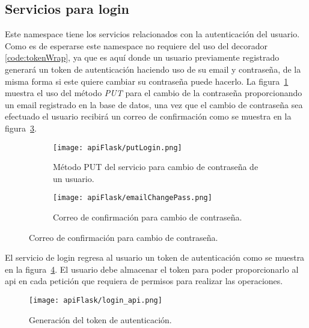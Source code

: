 \subsection{Servicios para login}

Este namespace tiene los servicios relacionados con la autenticación del usuario. Como es de esperarse este namespace no requiere del uso del decorador \ref{code:tokenWrap}, ya que es aquí donde un usuario previamente registrado generará un token de autenticación haciendo uso de su email y contraseña, de la misma forma si este quiere cambiar su contraseña puede hacerlo. La figura~\ref{img:putLogin} muestra el uso del método \textit{PUT} para el cambio de la contraseña proporcionando un email registrado en la base de datos, una vez que el cambio de contraseña sea efectuado el usuario recibirá un correo de confirmación como se muestra en la figura~\ref{img:changePass}.

\begin{figure}[H]
  \begin{subfigure}[b]{0.5\textwidth}
      \texttt{[image: apiFlask/putLogin.png]}
      \caption{Método PUT del servicio para cambio de contraseña de un usuario.}
      \label{img:putLogin}
    \end{subfigure}
    \hfill
    \begin{subfigure}[b]{0.5\textwidth}
      \texttt{[image: apiFlask/emailChangePass.png]}
      \caption{Correo de confirmación para cambio de contraseña.}
      \label{img:changePass}
    \end{subfigure}
\end{figure}

El servicio de login regresa al usuario un token de autenticación como se muestra en la figura~\ref{img:loginApi}. El usuario debe almacenar el token para poder proporcionarlo al api en cada petición que requiera de permisos para realizar las operaciones.


\begin{figure}[H]
  \centering
  \texttt{[image: apiFlask/login\_api.png]}
  \caption{Generación del token de autenticación.}
  \label{img:loginApi}
\end{figure}